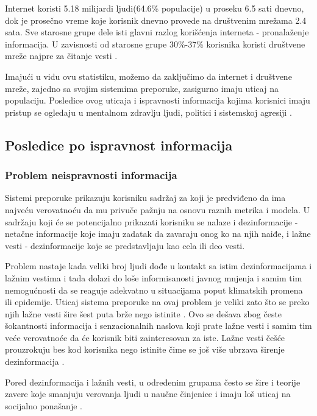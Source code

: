\documentclass[a4paper]{article}
\begin{document}
Internet koristi 5.18 milijardi ljudi(64.6\% populacije) u proseku 6.5 sati dnevno, dok je prosečno vreme koje korisnik dnevno provede na društvenim mrežama 2.4 sata. Sve starosne grupe dele isti glavni razlog korišćenja interneta - pronalaženje informacija. U zavisnosti od starosne grupe 30\%-37\% korisnika koristi društvene mreže najpre za čitanje vesti \cite{Kemp_2023}.

Imajući u vidu ovu statistiku, možemo da zaključimo da internet i društvene mreže, zajedno sa svojim sistemima preporuke, zasigurno imaju uticaj na populaciju. Posledice ovog uticaja i ispravnosti informacija kojima korisnici imaju pristup se ogledaju u mentalnom zdravlju ljudi, politici i sistemskoj agresiji \cite{Ledger_of_Harms}.


\subsection{Posledice po ispravnost informacija}
\label{subsec: posledice_informacije 1}


\subsubsection{Problem neispravnosti informacija}
\label{subsec: problem_informacije 1}


Sistemi preporuke prikazuju korisniku sadržaj za koji je predviđeno da ima najveću verovatnoću da mu privuče pažnju na osnovu raznih metrika i modela. U sadržaju koji će se potencijalno prikazati korisniku se nalaze i dezinformacije - netačne informacije koje imaju zadatak da zavaraju onog ko na njih naiđe, i lažne vesti - dezinformacije koje se predstavljaju kao cela ili deo vesti.

Problem nastaje kada veliki broj ljudi dođe u kontakt sa istim dezinformacijama i lažnim vestima i tada dolazi do loše informisanosti javnog mnjenja i samim tim nemogućnosti da se reaguje adekvatno u situacijama poput klimatskih promena ili epidemije. Uticaj sistema preporuke na ovaj problem je veliki zato što se preko njih lažne vesti šire šest puta brže nego istinite \cite{Vosoughi_Roy_Aral_2018}. Ovo se dešava zbog česte šokantnosti informacija i senzacionalnih naslova koji prate lažne vesti i samim tim veće verovatnoće da će korisnik biti zainteresovan za iste.
Lažne vesti češće prouzrokuju bes kod korisnika nego istinite \cite{Lu_2020} čime se još više ubrzava širenje dezinformacija \cite{Vosoughi_Roy_Aral_2018}.

Pored dezinformacija i lažnih vesti, u određenim grupama često se šire i teorije zavere koje smanjuju verovanja ljudi u naučne činjenice i imaju loš uticaj na socijalno ponašanje \cite{van_der_Linden_2015}.
\end{document}
